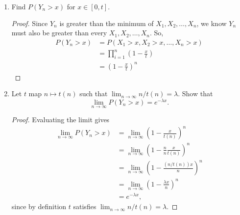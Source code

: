 \documentclass[oneside,reqno]{amsart}
\theoremstyle{definition}
\begin{document}
\begin{enumerate}
\item
Find $P(Y_n > x)$ for $x \in [0,t]$.
\begin{proof}
Since $Y_n$ is greater than the minimum of $X_1, X_2,\dotsc, X_n$, we know $Y_n$ must also be greater than every $X_1, X_2,\dotsc, X_n$. So,
\begin{align*}
	P(Y_n > x) &= P(X_1 > x, X_2 > x, \dotsc, X_n > x) \\
					  &= \prod_{i=1}^n \left( 1- \frac{x}{t} \right) \\
					  &= \left( 1- \frac{x}{t} \right)^n
\end{align*}
\end{proof}
\item
Let $t$ map $n \mapsto t(n)$ such that $\lim_{n \to \infty} n/t(n)= \lambda$. Show that 
\[
	\lim_{n \to \infty} P(Y_n > x) = e^{-\lambda x}.
\]
\begin{proof}
Evaluating the limit gives
\begin{align*} 
	\lim_{n \to \infty} P(Y_n > x) &= \lim_{n \to \infty} \left( 1-\frac{x}{t(n)} \right)^n \\
		&= \lim_{n \to \infty} \left(1-\frac{n}{n} \frac{x}{t(n)}\right)^n \\
		&= \lim_{n \to \infty} \left(1-\frac{(n/t(n))x}{n}\right)^n \\
		&= \lim_{n \to \infty} \left(1-\frac{\lambda x}{n}\right)^n \\
		&= e^{-\lambda x},
\end{align*}
since by definition $t$ satisfies $\lim_{n \to \infty} n/t(n) = \lambda$.
\end{proof}
\end{enumerate}
\end{document}
